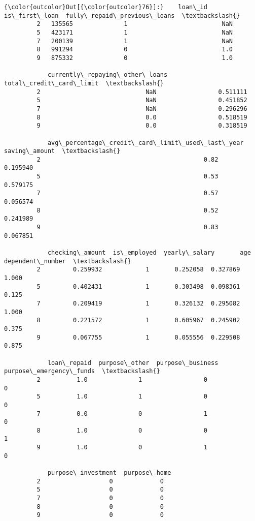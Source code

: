 \documentclass{report}
\begin{document}
            \begin{Verbatim}[commandchars=\\\{\}]
{\color{outcolor}Out[{\color{outcolor}76}]:}    loan\_id  is\_first\_loan  fully\_repaid\_previous\_loans  \textbackslash{}
         2   135565              1                          NaN   
         5   423171              1                          NaN   
         7   200139              1                          NaN   
         8   991294              0                          1.0   
         9   875332              0                          1.0   
         
            currently\_repaying\_other\_loans  total\_credit\_card\_limit  \textbackslash{}
         2                             NaN                 0.511111   
         5                             NaN                 0.451852   
         7                             NaN                 0.296296   
         8                             0.0                 0.518519   
         9                             0.0                 0.318519   
         
            avg\_percentage\_credit\_card\_limit\_used\_last\_year  saving\_amount  \textbackslash{}
         2                                             0.82       0.195940   
         5                                             0.53       0.579175   
         7                                             0.57       0.056574   
         8                                             0.52       0.241989   
         9                                             0.83       0.067851   
         
            checking\_amount  is\_employed  yearly\_salary       age  dependent\_number  \textbackslash{}
         2         0.259932            1       0.252058  0.327869             1.000   
         5         0.402431            1       0.303498  0.098361             0.125   
         7         0.209419            1       0.326132  0.295082             1.000   
         8         0.221572            1       0.605967  0.245902             0.375   
         9         0.067755            1       0.055556  0.229508             0.875   
         
            loan\_repaid  purpose\_other  purpose\_business  purpose\_emergency\_funds  \textbackslash{}
         2          1.0              1                 0                        0   
         5          1.0              1                 0                        0   
         7          0.0              0                 1                        0   
         8          1.0              0                 0                        1   
         9          1.0              0                 1                        0   
         
            purpose\_investment  purpose\_home  
         2                   0             0  
         5                   0             0  
         7                   0             0  
         8                   0             0  
         9                   0             0  
\end{Verbatim}
        
\end{document}
